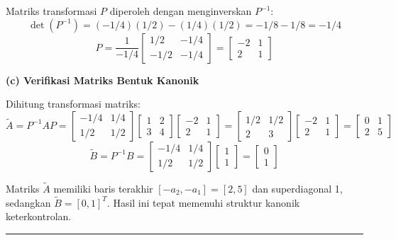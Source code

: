 \documentclass[11pt,a4paper]{article}
\begin{document}
Matriks transformasi $P$ diperoleh dengan menginverskan $P^{-1}$:
$$\det(P^{-1}) = (-1/4)(1/2) - (1/4)(1/2) = -1/8 - 1/8 = -1/4$$
$$P = \frac{1}{-1/4} \begin{bmatrix} 1/2 & -1/4 \\ -1/2 & -1/4 \end{bmatrix} = \begin{bmatrix} -2 & 1 \\ 2 & 1 \end{bmatrix}$$

\textbf{(c) Verifikasi Matriks Bentuk Kanonik}

Dihitung transformasi matriks:
$$\tilde{A} = P^{-1} A P = \begin{bmatrix} -1/4 & 1/4 \\ 1/2 & 1/2 \end{bmatrix} \begin{bmatrix} 1 & 2 \\ 3 & 4 \end{bmatrix} \begin{bmatrix} -2 & 1 \\ 2 & 1 \end{bmatrix} = \begin{bmatrix} 1/2 & 1/2 \\ 2 & 3 \end{bmatrix} \begin{bmatrix} -2 & 1 \\ 2 & 1 \end{bmatrix} = \begin{bmatrix} 0 & 1 \\ 2 & 5 \end{bmatrix}$$
$$\tilde{B} = P^{-1} B = \begin{bmatrix} -1/4 & 1/4 \\ 1/2 & 1/2 \end{bmatrix} \begin{bmatrix} 1 \\ 1 \end{bmatrix} = \begin{bmatrix} 0 \\ 1 \end{bmatrix}$$

Matriks $\tilde{A}$ memiliki baris terakhir $[-a_2, -a_1] = [2, 5]$ dan superdiagonal 1, sedangkan $\tilde{B} = [0, 1]^T$. Hasil ini tepat memenuhi struktur kanonik keterkontrolan.

\vspace{12pt}
\hrule
\vspace{10pt}
\end{document}
